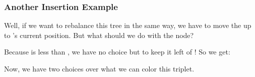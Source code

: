 \documentclass[aspectratio=169, handout]{beamer}
\begin{document}
\begin{frame}
  \frametitle{Another Insertion Example}

  \begin{center}
  \begin{minipage}{0.6\textwidth}
    \raggedright

    Well, if we want to rebalance this tree in the same way, we have to
    move the  up to 's current position. But what should we
    do with the  node?

    \pause
    \vspace{10pt}

    Because  is less than , we have no choice but to keep it
    left of ! So we get:

    \pause
    \vspace{10pt}

    Now, we have two choices over what we can color this triplet.

  \end{minipage}
  \hfill
  \begin{minipage}{0.37\textwidth}
    \centering
  \end{minipage}
  \end{center}
\end{frame}
\end{document}
